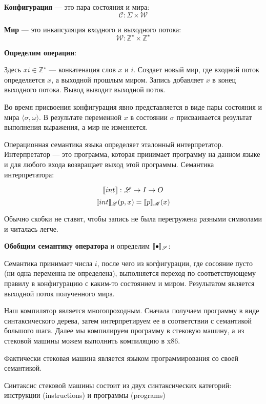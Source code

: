 \textbf{Конфигурация} --- это пара состояния и мира:
\[
    \mathscr{C} : \Sigma \times \mathscr{W}
\]

\textbf{Мир} --- это инкапсуляция входного и выходного потока:
\[
    \mathscr{W} : \mathbb{Z}^\star \times \mathbb{Z}^\star
\]

\textbf{Определим операции}:


Здесь $xi \in \mathbb{Z}^\star$ --- конкатенация слов $x$ и $i$. Создает новый
мир, где входной поток определяется $x$, а выходной прошлым миром. Запись
добавляет $x$ в конец выходного потока. Вывод выводит выходной поток.


Во время присвоения конфигурация явно представляется в виде пары состояния и
мира $\langle \sigma, \omega \rangle$. В результате переменной $x$ в состоянии
$\sigma$ присваивается результат выполнения выражения, а мир не изменяется.

Операционная семантика языка определяет эталонный интерпретатор. Интерпретатор
--- это программа, которая принимает программу на данном языке и для любого
входа возвращает выход этой программы. Семантика интерпретатора:

\[
    \llbracket int \rrbracket : \mathscr{L} \to I \to O
\]
\[
    \llbracket int \rrbracket_{\mathscr{L}} (p, x) = \llbracket p \rrbracket_{\mathscr{M}} (x)
\]

Обычно скобки не ставят, чтобы запись не была перегружена разными символами и
читалась легче.

\textbf{Обобщим семантику оператора} и определим $\llbracket \bullet \rrbracket_{\mathscr{S}}$:


Семантика принимает числа $i$, после чего из когфигурации, где сосояние пусто
(ни одна переменна не определена), выполняется переход по соответствующему
правилу в конфигурацию с каким-то состоянием и миром. Результатом является
выходной поток полученного мира.

Наш компилятор является многопроходным. Сначала получаем программу в виде
синтаксического дерева, затем интерпретируем ее в соответствии с семантикой
большого шага. Далее мы компилируем программу в стековую машину, а из стековой
машины можем выполнить компиляцию в x86.

Фактически стековая машина является языком программирования со своей
семантикой.

Синтаксис стековой машины состоит из двух синтаксических категорий: инструкции
(instructions) и программы (programs)

